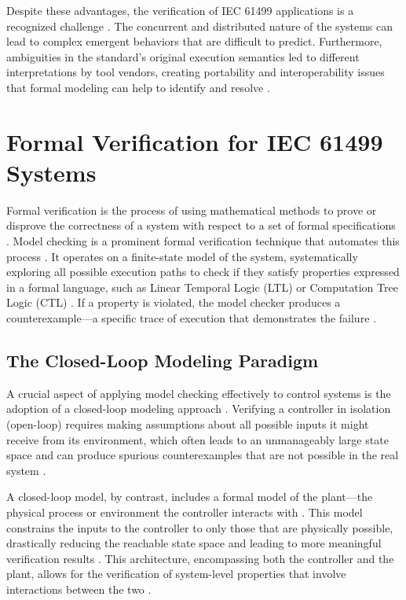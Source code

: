 Despite these advantages, the verification of IEC 61499 applications is a recognized challenge \cite{sinha2019survey}. The concurrent and distributed nature of the systems can lead to complex emergent behaviors that are difficult to predict. Furthermore, ambiguities in the standard's original execution semantics led to different interpretations by tool vendors, creating portability and interoperability issues that formal modeling can help to identify and resolve \cite{patil2015neutralizing}.

\section{Formal Verification for IEC 61499 Systems}\label{sec:formal_verification}

Formal verification is the process of using mathematical methods to prove or disprove the correctness of a system with respect to a set of formal specifications \cite{clarke1999}. Model checking is a prominent formal verification technique that automates this process \cite{baier2008}. It operates on a finite-state model of the system, systematically exploring all possible execution paths to check if they satisfy properties expressed in a formal language, such as Linear Temporal Logic (LTL) or Computation Tree Logic (CTL) \cite{emerson1985decision}. If a property is violated, the model checker produces a counterexample—a specific trace of execution that demonstrates the failure \cite{beer2012}.

\subsection{The Closed-Loop Modeling Paradigm}

A crucial aspect of applying model checking effectively to control systems is the adoption of a closed-loop modeling approach \cite{vyatkin2008closed}. Verifying a controller in isolation (open-loop) requires making assumptions about all possible inputs it might receive from its environment, which often leads to an unmanageably large state space and can produce spurious counterexamples that are not possible in the real system \cite{buzhinsky2016plant}.

A closed-loop model, by contrast, includes a formal model of the plant—the physical process or environment the controller interacts with \cite{xavier2021cyber}. This model constrains the inputs to the controller to only those that are physically possible, drastically reducing the reachable state space and leading to more meaningful verification results \cite{xavier2022plant}. This architecture, encompassing both the controller and the plant, allows for the verification of system-level properties that involve interactions between the two \cite{xavier2023formal}.

